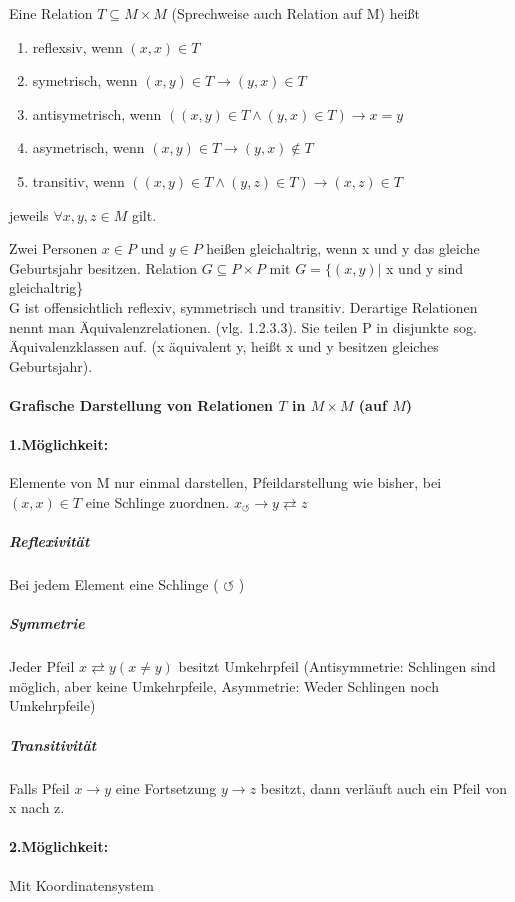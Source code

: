 \documentclass[a4paper]{scrartcl}
\begin{document}
Eine Relation $T\subseteq M\times M$ (Sprechweise auch Relation auf M) heißt
\begin{enumerate}
\item reflexsiv, wenn $(x,x) \in T$
\item symetrisch, wenn $(x,y) \in T \rightarrow (y,x) \in T$
\item antisymetrisch, wenn $((x,y)\in T \wedge (y,x) \in T) \rightarrow x=y$
\item asymetrisch, wenn $(x,y) \in T \rightarrow  (y,x) \notin T$
\item transitiv, wenn $((x,y) \in T \wedge (y,z) \in T) \rightarrow (x,z) \in T$
\end{enumerate}
jeweils $\forall x,y,z \in M$ gilt.

Zwei Personen $x \in P$ und $y \in P$ heißen gleichaltrig, wenn x und y das gleiche Geburtsjahr besitzen.
Relation $G \subseteq P \times P$ mit $ G =\{ (x,y) \vert$ x und y sind gleichaltrig\}\\
G ist offensichtlich reflexiv, symmetrisch und transitiv.
Derartige Relationen nennt man Äquivalenzrelationen. (vlg. 1.2.3.3). Sie teilen P in disjunkte sog. Äquivalenzklassen auf. (x äquivalent y, heißt x und y besitzen gleiches Geburtsjahr).

\paragraph{Grafische Darstellung von Relationen $T$ in $M \times M$ (auf $M$)}

\paragraph{1.Möglichkeit:} Elemente von M nur einmal darstellen, Pfeildarstellung wie bisher, bei $(x,x)\in T$ eine Schlinge zuordnen.
$x_\circlearrowleft \rightarrow y \rightleftarrows z$
\subparagraph{Reflexivität}Bei jedem Element eine Schlinge ( $\circlearrowleft$ )
\subparagraph{Symmetrie}Jeder Pfeil $x \rightleftarrows y (x \neq y)$
besitzt Umkehrpfeil (Antisymmetrie: Schlingen sind möglich, aber keine Umkehrpfeile, Asymmetrie: Weder Schlingen noch Umkehrpfeile)
\subparagraph{Transitivität} Falls Pfeil $x \rightarrow y$ eine Fortsetzung $y \rightarrow z$ besitzt, dann verläuft auch ein Pfeil von x nach z.

\paragraph{2.Möglichkeit:} Mit Koordinatensystem
\end{document}
